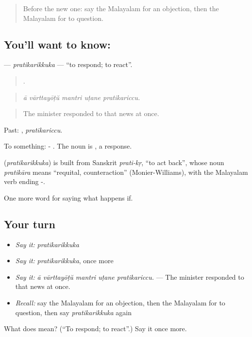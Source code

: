 \label{lesson:ML-C453-pratikarikkuka}



\begin{quote}
Before the new one: say the Malayalam for an objection, then the Malayalam for to question.
\end{quote}

\subsection*{You'll want to know: }
\textbf{} — \emph{pratikarikkuka} — \textquotedblleft{}to respond; to react\textquotedblright{}.

\begin{quote}
    .
\end{quote}

\begin{quote}
\emph{ā vārttayōṭŭ mantri uṭane pratikariccu.}
\end{quote}

\begin{quote}
The minister responded to that news at once.
\end{quote}

Past: , \emph{pratikariccu}.

To something: - . The noun is , a response.

\begin{cousinweb}
\textbf{} (\emph{pratikarikkuka}) is built from Sanskrit \emph{prati-kṛ}, \textquotedblleft{}to act back\textquotedblright{}, whose noun \emph{pratikāra} means \textquotedblleft{}requital, counteraction\textquotedblright{} (Monier-Williams), with the Malayalam verb ending -.
\end{cousinweb}

\begin{grammarlens}[title={What you've built}]
One more word for saying what happens if.
\end{grammarlens}

\subsection*{Your turn}
\begin{itemize}
\raggedright
  \item \emph{Say it:} \emph{pratikarikkuka}
  \item \emph{Say it:} \emph{pratikarikkuka}, once more
  \item \emph{Say it:} \emph{ā vārttayōṭŭ mantri uṭane pratikariccu.} — The minister responded to that news at once.
  \item \emph{Recall:} say the Malayalam for an objection, then the Malayalam for to question, then say \emph{pratikarikkuka} again
\end{itemize}

\begin{tcolorbox}[breakable,colback=teal!4,colframe=teal!35!black,title={Before you move on}]
What does  mean? (\textquotedblleft{}To respond; to react\textquotedblright{}.) Say it once more.
\end{tcolorbox}
